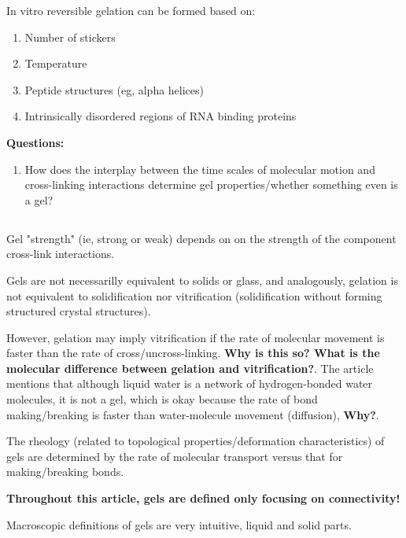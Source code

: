 \documentclass{article}
\begin{document}
In vitro reversible gelation can be formed based on:

\begin{enumerate}
    \item Number of stickers
    \item Temperature
    \item Peptide structures (eg, alpha helices)
    \item Intrinsically disordered regions of RNA binding proteins
\end{enumerate}

\textbf{Questions:}

\begin{enumerate}
    \item How does the interplay between the time scales of molecular motion and cross-linking interactions determine gel properties/whether something even is a gel?
\end{enumerate}

\subsection{}

Gel "strength" (ie, strong or weak) depends on on the strength of the component cross-link interactions.

Gels are not necessarilly equivalent to solids or glass, and analogously, gelation is not equivalent to solidification nor vitrification (solidification without forming structured crystal structures).

However, gelation may imply vitrification if the rate of molecular movement is faster than the rate of cross/uncross-linking. \textbf{Why is this so? What is the molecular difference between gelation and vitrification?}. The article mentions that although liquid water is a network of hydrogen-bonded water molecules, it is not a gel, which is okay because the rate of bond making/breaking is faster than water-molecule movement (diffusion), \textbf{Why?}.

The rheology (related to topological properties/deformation characteristics) of gels are determined by the rate of molecular transport versus that for making/breaking bonds.

\textbf{Throughout this article, gels are defined only focusing on connectivity!}

Macroscopic definitions of gels are very intuitive, liquid and solid parts.

\subsection{}
\end{document}
